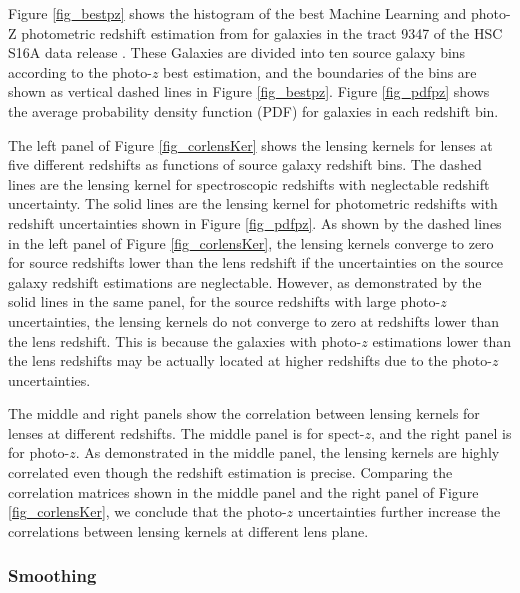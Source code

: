 \documentclass[twocolumn]{aastex62}
\begin{document}
Figure \ref{fig_bestpz} shows the histogram of the best Machine Learning and
photo-Z \citep[MLZ]{MLZ-TPZ2013} photometric redshift estimation from
\cite{HSC1-photoz} for galaxies in the tract 9347 of the HSC S16A data release
\citep{HSC1-data}. These Galaxies are divided into ten source galaxy bins
according to the photo-$z$ best estimation, and the boundaries of the bins are
shown as vertical dashed lines in Figure \ref{fig_bestpz}. Figure \ref{fig_pdfpz}
shows the average probability density function (PDF) for galaxies in each
redshift bin.

The left panel of Figure \ref{fig_corlensKer} shows the lensing kernels for
lenses at five different redshifts as functions of source galaxy redshift bins.
The dashed lines are the lensing kernel for spectroscopic redshifts with
neglectable redshift uncertainty. The solid lines are the lensing kernel for
photometric redshifts with redshift uncertainties shown in Figure
\ref{fig_pdfpz}.  As shown by the dashed lines in the left panel of Figure
\ref{fig_corlensKer}, the lensing kernels converge to zero for source redshifts
lower than the lens redshift if the uncertainties on the source galaxy
redshift estimations are neglectable. However, as demonstrated by the solid
lines in the same panel, for the source redshifts with large photo-$z$
uncertainties, the lensing kernels do not converge to zero at redshifts lower
than the lens redshift. This is because the galaxies with photo-$z$ estimations
lower than the lens redshifts may be actually located at higher redshifts due
to the photo-$z$ uncertainties.

The middle and right panels show the correlation between lensing kernels for
lenses at different redshifts. The middle panel is for spect-$z$, and the right
panel is for photo-$z$.  As demonstrated in the middle panel, the lensing
kernels are highly correlated even though the redshift estimation is precise.
Comparing the correlation matrices shown in the middle panel and the right
panel of Figure \ref{fig_corlensKer}, we conclude that the photo-$z$
uncertainties further increase the correlations between lensing kernels at
different lens plane.

\subsubsection{Smoothing}
\label{subsec:method-smoothing}
\end{document}
